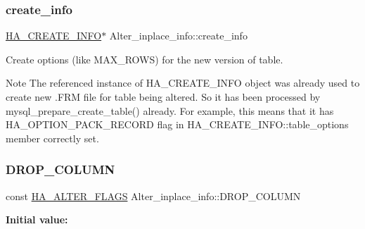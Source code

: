 \subsubsection{\texorpdfstring{create\+\_\+info}{create\_info}}
{\footnotesize\ttfamily \mbox{\hyperlink{structst__ha__create__information}{H\+A\+\_\+\+C\+R\+E\+A\+T\+E\+\_\+\+I\+N\+FO}}$\ast$ Alter\+\_\+inplace\+\_\+info\+::create\+\_\+info}

Create options (like M\+A\+X\+\_\+\+R\+O\+WS) for the new version of table.

\begin{DoxyNote}{Note}
The referenced instance of H\+A\+\_\+\+C\+R\+E\+A\+T\+E\+\_\+\+I\+N\+FO object was already used to create new .F\+RM file for table being altered. So it has been processed by mysql\+\_\+prepare\+\_\+create\+\_\+table() already. For example, this means that it has H\+A\+\_\+\+O\+P\+T\+I\+O\+N\+\_\+\+P\+A\+C\+K\+\_\+\+R\+E\+C\+O\+RD flag in H\+A\+\_\+\+C\+R\+E\+A\+T\+E\+\_\+\+I\+N\+F\+O\+::table\+\_\+options member correctly set. 
\end{DoxyNote}
\mbox{\label{classAlter__inplace__info_a1c0db1b0cabe62efd45b72cf052c2fd2}} 
\subsubsection{\texorpdfstring{D\+R\+O\+P\+\_\+\+C\+O\+L\+U\+MN}{DROP\_COLUMN}}
{\footnotesize\ttfamily const \mbox{\hyperlink{classAlter__inplace__info_a45258f36b4942b5cabee7239463daaca}{H\+A\+\_\+\+A\+L\+T\+E\+R\+\_\+\+F\+L\+A\+GS}} Alter\+\_\+inplace\+\_\+info\+::\+D\+R\+O\+P\+\_\+\+C\+O\+L\+U\+MN\hspace{0.3cm}{\ttfamily [static]}}

{\bfseries Initial value\+:}
\begin{DoxyCode}{0}
\end{DoxyCode}
\mbox{\label{classAlter__inplace__info_aeacdbdf2da7047907f86f6b78b4cda9e}} 
